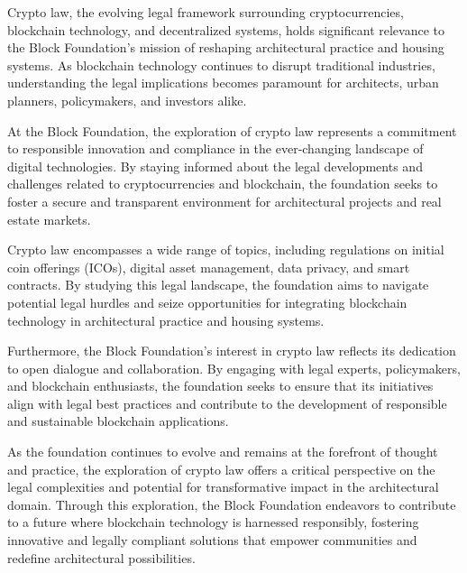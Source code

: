 Crypto law, the evolving legal framework surrounding cryptocurrencies, blockchain technology, and decentralized systems, holds significant relevance to the Block Foundation's mission of reshaping architectural practice and housing systems. As blockchain technology continues to disrupt traditional industries, understanding the legal implications becomes paramount for architects, urban planners, policymakers, and investors alike.

At the Block Foundation, the exploration of crypto law represents a commitment to responsible innovation and compliance in the ever-changing landscape of digital technologies. By staying informed about the legal developments and challenges related to cryptocurrencies and blockchain, the foundation seeks to foster a secure and transparent environment for architectural projects and real estate markets.

Crypto law encompasses a wide range of topics, including regulations on initial coin offerings (ICOs), digital asset management, data privacy, and smart contracts. By studying this legal landscape, the foundation aims to navigate potential legal hurdles and seize opportunities for integrating blockchain technology in architectural practice and housing systems.

Furthermore, the Block Foundation's interest in crypto law reflects its dedication to open dialogue and collaboration. By engaging with legal experts, policymakers, and blockchain enthusiasts, the foundation seeks to ensure that its initiatives align with legal best practices and contribute to the development of responsible and sustainable blockchain applications.

As the foundation continues to evolve and remains at the forefront of thought and practice, the exploration of crypto law offers a critical perspective on the legal complexities and potential for transformative impact in the architectural domain. Through this exploration, the Block Foundation endeavors to contribute to a future where blockchain technology is harnessed responsibly, fostering innovative and legally compliant solutions that empower communities and redefine architectural possibilities.